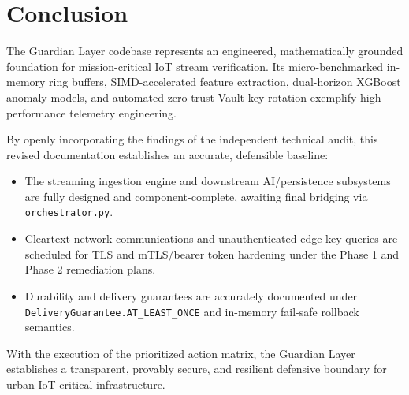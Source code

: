 \documentclass[10pt,a4paper]{report}
\begin{document}
\chapter{Conclusion}

The Guardian Layer codebase represents an engineered, mathematically grounded foundation for mission-critical IoT stream verification. Its micro-benchmarked in-memory ring buffers, SIMD-accelerated feature extraction, dual-horizon XGBoost anomaly models, and automated zero-trust Vault key rotation exemplify high-performance telemetry engineering.

By openly incorporating the findings of the independent technical audit, this revised documentation establishes an accurate, defensible baseline:
\begin{itemize}[leftmargin=*]
  \item The streaming ingestion engine and downstream AI/persistence subsystems are fully designed and component-complete, awaiting final bridging via \texttt{orchestrator.py}.
  \item Cleartext network communications and unauthenticated edge key queries are scheduled for TLS and mTLS/bearer token hardening under the Phase 1 and Phase 2 remediation plans.
  \item Durability and delivery guarantees are accurately documented under \lstinline{DeliveryGuarantee.AT_LEAST_ONCE} and in-memory fail-safe rollback semantics.
\end{itemize}

With the execution of the prioritized action matrix, the Guardian Layer establishes a transparent, provably secure, and resilient defensive boundary for urban IoT critical infrastructure.
\end{document}
